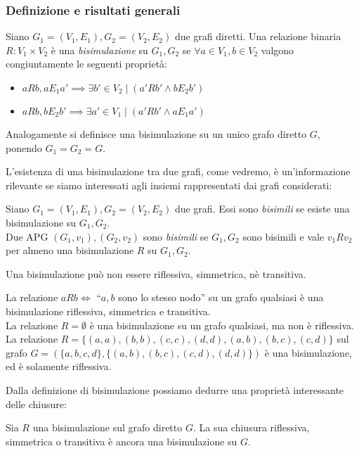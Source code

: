 \subsubsection{Definizione e risultati generali}
\begin{definition}
    Siano $G_1 = (V_1,E_1), G_2 = (V_2,E_2)$ due grafi diretti. Una relazione binaria $R: V_1 \times V_2$ è una \emph{bisimulazione} su $G_1, G_2$ se $\forall a \in V_1, b \in V_2$ valgono congiuntamente le seguenti proprietà:
    \begin{itemize}
        \item $a R b, a E_1 a' \implies \exists b' \in V_2 \mid (a' R b' \land b E_2 b')$
        \item $a R b, b E_2 b' \implies \exists a' \in V_1 \mid (a' R b' \land a E_1 a')$
    \end{itemize}
    Analogamente si definisce una bisimulazione su un unico grafo diretto $G$, ponendo $G_1 = G_2 = G$.
\end{definition}
L'esistenza di una bisimulazione tra due grafi, come vedremo, è un'informazione rilevante se siamo interessati agli insiemi rappresentati dai grafi considerati:
\begin{definition}
    Siano $G_1 = (V_1,E_1), G_2 = (V_2,E_2)$ due grafi. Essi sono \emph{bisimili} se esiste una bisimulazione su $G_1, G_2$.\\
    Due APG $(G_1, v_1), (G_2, v_2)$ sono \emph{bisimili} se $G_1, G_2$ sono bisimili e vale $v_1 R v_2$ per almeno una bisimulazione $R$ su $G_1, G_2$.
\end{definition}
\begin{observation}
    Una bisimulazione può non essere riflessiva, simmetrica, nè transitiva.
\end{observation}
\begin{example}
    La relazione $a R b \iff$ ``$a,b$ sono lo stesso nodo'' su un grafo qualsiasi è una bisimulazione riflessiva, simmetrica e transitiva.\\
    La relazione $R = \emptyset$ è una bisimulazione su un grafo qualsiasi, ma non è riflessiva.\\
    La relazione $R = \{(a,a),(b,b),(c,c),(d,d),(a,b),(b,c),(c,d)\}$ sul grafo $G = (\{a,b,c,d\}, \{(a,b),(b,c),(c,d),(d,d)\})$ è una bisimulazione, ed è solamente riflessiva.
\end{example}
Dalla definizione di bisimulazione possiamo dedurre una proprietà interessante delle chiusure:
\begin{theorem}
    Sia $R$ una bisimulazione sul grafo diretto $G$. La sua chiusura riflessiva, simmetrica o transitiva è ancora una bisimulazione su $G$.
\end{theorem}
